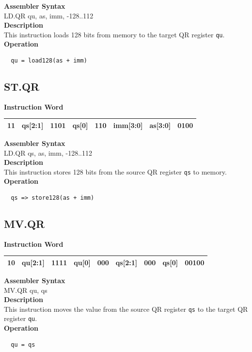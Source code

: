 \textbf{Assembler Syntax} \\
LD.QR qu, as, imm, -128..112  \\
\textbf{Description} \\
This instruction loads 128 bits from memory to the target QR register \lstinline{qu}.\\
\textbf{Operation}
\begin{lstlisting}
  qu = load128(as + imm)
\end{lstlisting}

\clearpage
\subsection{ST.QR}\label{instruction:STQR}
\setlength\tabcolsep{6pt}
\textbf{Instruction Word} \\
\begin{tabular}{|c|c|c|c|c|c|c|c|}
	\hline
	11 & qs[2:1] & 1101 & qs[0] & 110 & imm[3:0] & as[3:0] & 0100 \\
	\hline
\end{tabular}

\textbf{Assembler Syntax} \\
LD.QR qs, as, imm, -128..112  \\
\textbf{Description} \\
This instruction stores 128 bits from the source QR register \lstinline{qs} to memory.\\
\textbf{Operation}
\begin{lstlisting}
  qs => store128(as + imm)
\end{lstlisting}


\clearpage
\subsection{MV.QR}\label{instruction:MVQR}
\setlength\tabcolsep{6pt}
\textbf{Instruction Word} \\
\begin{tabular}{|c|c|c|c|c|c|c|c|c|}
	\hline
	10 & qu[2:1] & 1111 & qu[0] & 000 & qs[2:1] & 000 & qs[0] & 00100 \\
	\hline
\end{tabular}

\textbf{Assembler Syntax} \\
MV.QR qu, qs \\
\textbf{Description} \\
This instruction moves the value from the source QR register \lstinline{qs} to the target QR register \lstinline{qu}.\\
\textbf{Operation}
\begin{lstlisting}
  qu = qs
\end{lstlisting}
